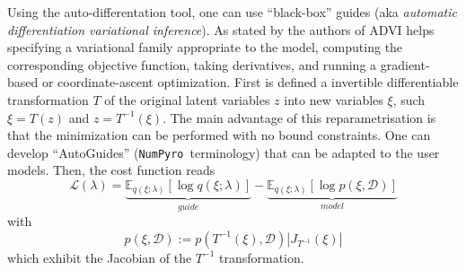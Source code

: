 \documentclass[twocolumn,twocolappendix,nofootinbib,iop]{openjournal}
\newcommand{\numpyro}{\texttt{NumPyro}}
\newcommand{\bydef}{:=}
\begin{document}
Using the auto-differentation tool, one can use ``black-box'' guides (aka \textit{automatic differentiation variational inference}). As stated by the authors of \citep{2016arXiv160300788K} ADVI helps specifying a variational family appropriate to the model, computing the corresponding objective
function, taking derivatives, and running a gradient-based or coordinate-ascent optimization. First is defined a invertible differentiable transformation $T$ of the original latent variables $z$ into new variables $\xi$, such $\xi=T(z)$ and $z=T^{-1}(\xi)$. The main advantage of this reparametrisation is that the minimization can be performed with no bound constraints. One can develop ``AutoGuides'' (\numpyro\ terminology) that can be adapted to the user models. Then, the cost function reads
\begin{equation}
\mathcal{L}(\lambda) = \underbrace{\mathbb{E}_{q(\xi;\lambda)}\left[ \log q(\xi;\lambda)\right]}_{guide} - \underbrace{\mathbb{E}_{q(\xi;\lambda)}\left[ \log p(\xi,\mathcal{D}) \right]}_{model}
\label{eq-loss-svi-2}
\end{equation}
with
\begin{equation}
p(\xi,\mathcal{D}) \bydef p(T^{-1}(\xi),\mathcal{D}) |J_{T^{-1}}(\xi)|
\end{equation}
which exhibit the Jacobian of the $T^{-1}$ transformation.
\end{document}
